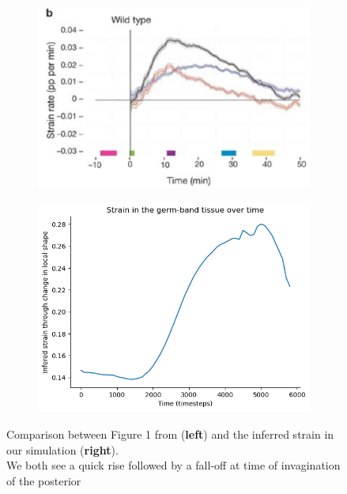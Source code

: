 \begin{figure}[H]
    \centering
    \begin{subfigure}{0.45\linewidth}
        \centering
        \includegraphics[width = \linewidth]{chapters/Results/figures/strain_rate_extrinsic.png}
    \end{subfigure}
        \begin{subfigure}{0.45\linewidth}
        \centering
        \includegraphics[width = \linewidth]{chapters/Results/figures/strain_smoothedpng.png}
    \end{subfigure}
    \caption{Comparison between Figure 1 from  (\textbf{left}) and the inferred strain in our simulation (\textbf{right}).\\
    We both see a quick rise followed by a fall-off at time of invagination of the posterior\\}
    \label{fig:strain}
\end{figure}

